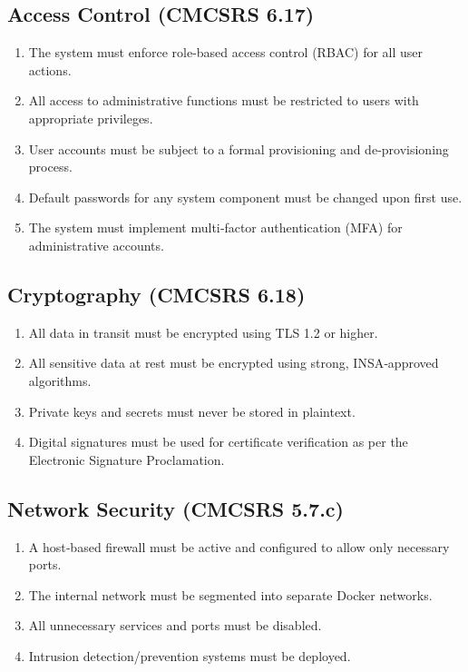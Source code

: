 \subsection{Access Control (CMCSRS 6.17)}
\begin{enumerate}[label=\textbf{SEC-NFR-001-\arabic*.}, leftmargin=*, align=left]
    \item The system must enforce role‑based access control (RBAC) for all user actions.
    \item All access to administrative functions must be restricted to users with appropriate privileges.
    \item User accounts must be subject to a formal provisioning and de‑provisioning process.
    \item Default passwords for any system component must be changed upon first use.
    \item The system must implement multi‑factor authentication (MFA) for administrative accounts.
\end{enumerate}

\subsection{Cryptography (CMCSRS 6.18)}
\begin{enumerate}[label=\textbf{SEC-NFR-002-\arabic*.}, leftmargin=*, align=left]
    \item All data in transit must be encrypted using TLS 1.2 or higher.
    \item All sensitive data at rest must be encrypted using strong, INSA‑approved algorithms.
    \item Private keys and secrets must never be stored in plaintext.
    \item Digital signatures must be used for certificate verification as per the Electronic Signature Proclamation.
\end{enumerate}

\subsection{Network Security (CMCSRS 5.7.c)}
\begin{enumerate}[label=\textbf{SEC-NFR-003-\arabic*.}, leftmargin=*, align=left]
    \item A host‑based firewall must be active and configured to allow only necessary ports.
    \item The internal network must be segmented into separate Docker networks.
    \item All unnecessary services and ports must be disabled.
    \item Intrusion detection/prevention systems must be deployed.
\end{enumerate}

